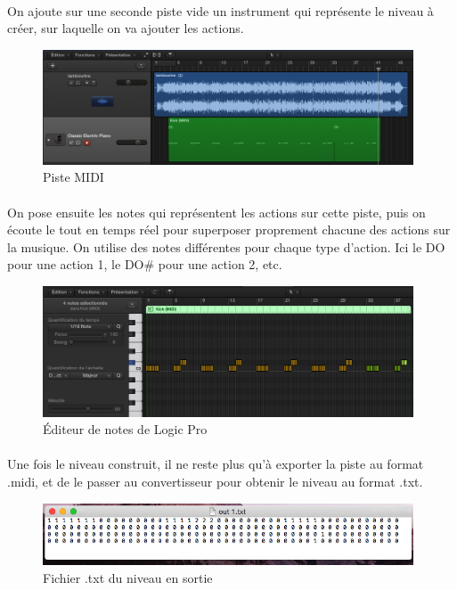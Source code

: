 \paragraph{}
On ajoute sur une seconde piste vide un instrument qui représente le niveau à créer, sur laquelle on va ajouter les actions.\\

\begin{figure}[H]\centering
  \includegraphics[width=11cm]{./img/logic_midi.png}
  \caption{Piste MIDI}
  \label{transitions_scenes}
\end{figure}


\paragraph{}
On pose ensuite les notes qui représentent les actions sur cette piste, puis on écoute le tout en temps réel pour superposer proprement chacune des actions sur la musique. On utilise des notes différentes pour chaque type d'action. Ici le DO pour une action 1, le DO\# pour une action 2, etc.

\begin{figure}[H]\centering
  \includegraphics[width=11cm]{./img/logic_edit.png}
  \caption{Éditeur de notes de Logic Pro}
  \label{pianoroll}
\end{figure}

\paragraph{}
Une fois le niveau construit, il ne reste plus qu'à exporter la piste au format .midi, et de le passer au convertisseur pour obtenir le niveau au format .txt.

\begin{figure}[H]\centering
  \includegraphics[width=11cm]{./img/logic_export.png}
  \caption{Fichier .txt du niveau en sortie}
  \label{level}
\end{figure}


